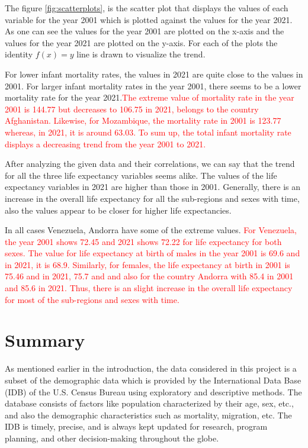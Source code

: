 \documentclass[12 pt]{scrartcl}
\newcommand{\red}{\textcolor{red}}
\begin{document}
	The figure \ref{fig:scatterplots}, is the scatter plot that displays the values of each variable for the year 2001 which is plotted against the values for the year 2021. As one can see the values for the year 2001 are plotted on the x-axis and the values for the year 2021 are plotted on the y-axis. For each of the plots the identity $f(x)=y$ line is drawn to visualize the trend.
	
	For lower infant mortality rates, the values in 2021 are quite close to the values in 2001. For larger infant mortality rates in the year 2001, there seems to be a lower mortality rate for the year 2021.\red{The extreme value of mortality rate in the year 2001 is 144.77 but decreases to 106.75 in 2021, belongs to the country Afghanistan. Likewise, for Mozambique, the mortality rate in 2001 is 123.77 whereas, in 2021, it is around 63.03. To sum up, the total infant mortality	rate displays a decreasing trend from the year 2001 to 2021.}
	
	After analyzing the given data and their correlations, we can say that the trend for all the three life expectancy variables seems alike. The values of the life expectancy variables in 2021 are higher than those in 2001. Generally, there is an increase in the overall life expectancy for all the sub-regions and sexes with time, also the values appear to be closer for higher life expectancies. 
	
	In all cases Venezuela, Andorra have some of the extreme values. \red{For Venezuela, the year 2001 shows 72.45 and 2021 shows 72.22 for life expectancy for both sexes. The value for life expectancy at birth of males in the year 2001 is 69.6 and in 2021, it is 68.9. Similarly, for females, the life expectancy at birth in 2001 is 75.46 and in 2021, 75.7 and and also for the country Andorra with 85.4 in 2001 and 85.6 in 2021. Thus, there is an slight increase in the overall life expectancy for most of the sub-regions and sexes with time.}
	
	\section{Summary}
	As mentioned earlier in the introduction, the data considered in this project is a subset of the demographic data which is provided by the International Data Base (IDB) of the U.S. Census Bureau using exploratory and descriptive methods. The database consists of factors like population characterized by their age, sex, etc., and also the demographic characteristics such as mortality, migration, etc. The IDB is timely, precise, and is always kept updated for research, program planning, and other decision-making throughout the globe.
	
\end{document}
